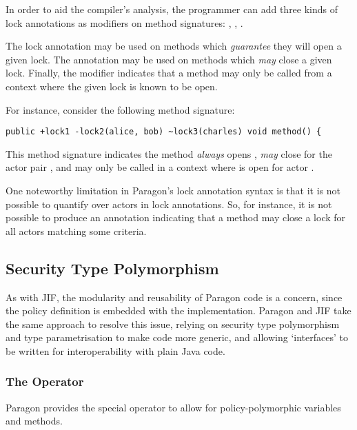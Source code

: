 In order to aid the compiler's analysis, the programmer can add three kinds of lock annotations as modifiers on method signatures: , , .


The \mono{+} lock annotation may be used on methods which \textit{guarantee} they will open a given lock. The \mono{-} annotation may be used on methods which \textit{may} close a given lock. Finally, the \mono{\textasciitilde} modifier indicates that a method may only be called from a context where the given lock is known to be open.

For instance, consider the following method signature:

\begin{verbatim}
public +lock1 -lock2(alice, bob) ~lock3(charles) void method() {
\end{verbatim}

This method signature indicates the method \textit{always} opens , \textit{may} close  for the actor pair , and may only be called in a context where  is open for actor .

One noteworthy limitation in Paragon's lock annotation syntax is that it is not possible to quantify over actors in lock annotations. So, for instance, it is not possible to produce an annotation indicating that a method may close a lock for all actors matching some criteria.

\subsection{Security Type Polymorphism} \label{para_generics}

As with JIF, the modularity and reusability of Paragon code is a concern, since the policy definition is embedded with the implementation. Paragon and JIF take the same approach to resolve this issue, relying on security type polymorphism and type parametrisation to make code more generic, and allowing `interfaces' to be written for interoperability with plain Java code.

\subsubsection{The  Operator}

Paragon provides the special  operator to allow for policy-polymorphic variables and methods.

